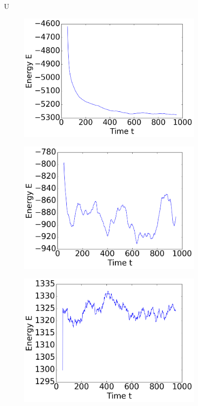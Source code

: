 \begin{figure}[ht]
U
\hfill
\begin{subfigure}{0.3\textwidth}
\includegraphics[width=\textwidth]{../dat/avTotal_Energy_T0d3_M100.png}
\end{subfigure}
\hfill
\begin{subfigure}{0.3\textwidth}
\includegraphics[width=\textwidth]{../dat/avTotal_Energy_T1d0_M100.png}
\end{subfigure}
\hfill
\begin{subfigure}{0.3\textwidth}
\includegraphics[width=\textwidth]{../dat/avTotal_Energy_T2d0_M100.png}
\end{subfigure}


\end{figure}

